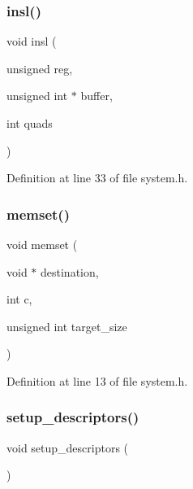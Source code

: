 \subsubsection{\texorpdfstring{insl()}{insl()}}
{\footnotesize\ttfamily void insl (\begin{DoxyParamCaption}\item[{unsigned}]{reg,  }\item[{unsigned int $\ast$}]{buffer,  }\item[{int}]{quads }\end{DoxyParamCaption})}



Definition at line 33 of file system.\+h.

\mbox{\label{a00032_a118c1a380204d08f9bf9ab79d650b173_a118c1a380204d08f9bf9ab79d650b173}} 
\subsubsection{\texorpdfstring{memset()}{memset()}}
{\footnotesize\ttfamily void memset (\begin{DoxyParamCaption}\item[{void $\ast$}]{destination,  }\item[{int}]{c,  }\item[{unsigned int}]{target\+\_\+size }\end{DoxyParamCaption})}



Definition at line 13 of file system.\+h.

\mbox{\label{a00032_a8deca218d19174936135d90f3c817c04_a8deca218d19174936135d90f3c817c04}} 
\subsubsection{\texorpdfstring{setup\+\_\+descriptors()}{setup\_descriptors()}}
{\footnotesize\ttfamily void setup\+\_\+descriptors (\begin{DoxyParamCaption}{ }\end{DoxyParamCaption})}




